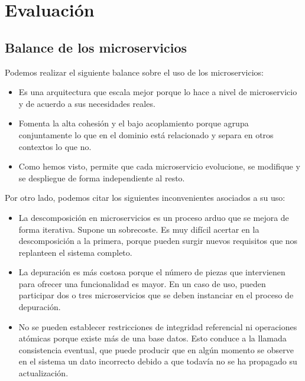 \documentclass[11pt,a4paper]{article}
\begin{document}
\section{Evaluación}

\subsection{Balance de los microservicios}

Podemos realizar el siguiente balance sobre el uso de los microservicios:

\begin{itemize}

\item Es una arquitectura que escala mejor porque lo hace a nivel de microservicio y de acuerdo a sus necesidades reales.

\item Fomenta la alta cohesión y el bajo acoplamiento porque agrupa conjuntamente lo que en el dominio está relacionado y separa en otros contextos lo que no.

\item Como hemos visto, permite que cada microservicio evolucione, se modifique y se despliegue de forma independiente al resto.

\end{itemize}

Por otro lado, podemos citar los siguientes inconvenientes asociados a su uso:

\begin{itemize}

\item La descomposición en microservicios es un proceso arduo que se mejora de forma iterativa. Supone un sobrecoste. Es muy difícil acertar en la descomposición a la primera, porque pueden surgir nuevos requisitos que nos replanteen el sistema completo.

\item La depuración es más costosa porque el número de piezas que intervienen para ofrecer una funcionalidad es mayor. En un caso de uso, pueden participar dos o tres microservicios que se deben instanciar en el proceso de depuración.

\item No se pueden establecer restricciones de integridad referencial ni operaciones atómicas porque existe más de una base datos. Esto conduce a la llamada consistencia eventual, que puede producir que en algún momento se observe en el sistema un dato incorrecto debido a que todavía no se ha propagado su actualización.

\end{itemize}
\end{document}
